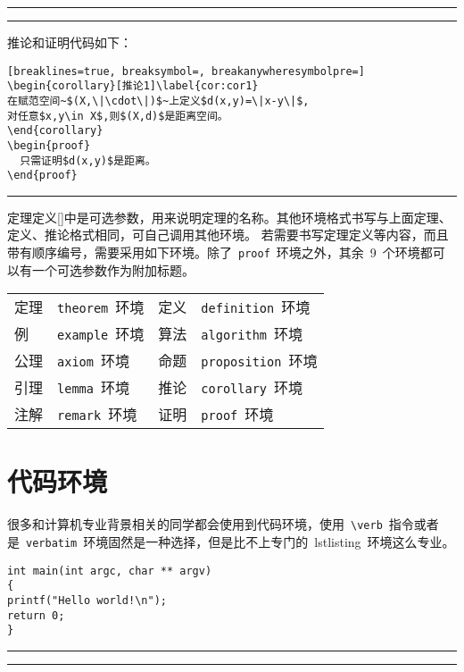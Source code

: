 \noindent\hrule\vspace{0.1em}

\noindent\hrule
\vspace{1em}
推论和证明代码如下：
\begin{Verbatim}[breaklines=true, breaksymbol=, breakanywheresymbolpre=]
\begin{corollary}[推论1]\label{cor:cor1}
在赋范空间~$(X,\|\cdot\|)$~上定义$d(x,y)=\|x-y\|$,
对任意$x,y\in X$,则$(X,d)$是距离空间。
\end{corollary}
\begin{proof}
  只需证明$d(x,y)$是距离。
\end{proof}
\end{Verbatim}
\noindent\hrule\vspace{1em}

定理定义[]中是可选参数，用来说明定理的名称。其他环境格式书写与上面定理、定义、推论格式相同，可自己调用其他环境。
若需要书写定理定义等内容，而且带有顺序编号，需要采用如下环境。除了~\verb|proof|~环境之外，其余~9~个环境都可以有一个可选参数作为附加标题。

\begin{center}
\vspace{0.5em}\noindent\wuhao\begin{tabularx}{0.7\textwidth}{lX|lX}
定理 & \verb|theorem|~环境 & 定义 & \verb|definition|~环境 \\
例 & \verb|example|~环境 & 算法 & \verb|algorithm|~环境 \\
公理 & \verb|axiom|~环境 & 命题 & \verb|proposition|~环境 \\
引理 & \verb|lemma|~环境 & 推论 & \verb|corollary|~环境 \\
注解 & \verb|remark|~环境 & 证明 & \verb|proof|~环境 \\
\end{tabularx}
\end{center}
\section{代码环境}
很多和计算机专业背景相关的同学都会使用到代码环境，使用~\verb|\verb|~指令或者是~\verb|verbatim|~环境固然是一种选择，但是比不上专门的~lstlisting~环境这么专业。
\begin{lstlisting}
int main(int argc, char ** argv)
{
printf("Hello world!\n");
return 0;
}
\end{lstlisting}

\noindent\hrule
\vspace{0.1em}\noindent\hrule

